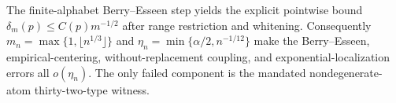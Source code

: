 The finite-alphabet Berry--Esseen step yields the explicit pointwise bound \(\delta_m(p)\leq C(p)m^{-1/2}\) after range restriction and whitening. Consequently \(m_n=\max\{1,\lfloor n^{1/3}\rfloor\}\) and \(\eta_n=\min\{\alpha/2,n^{-1/12}\}\) make the Berry--Esseen, empirical-centering, without-replacement coupling, and exponential-localization errors all \(o(\eta_n)\). The only failed component is the mandated nondegenerate-atom thirty-two-type witness.